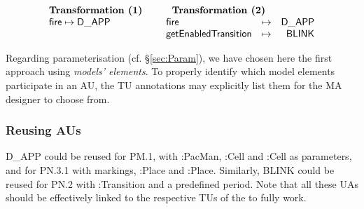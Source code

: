 $$\begin{array}[t]{l}
   \textbf{Transformation (1)}\\
   \mathsf{fire} \mapsto \mathsf{D\_APP}
\end{array}
\hspace{0.5cm}
\begin{array}[t]{lcr}
   \multicolumn{2}{c}{\textbf{Transformation (2)}}\\
	\mathsf{fire} &\mapsto& \mathsf{D\_APP}\\
	\mathsf{getEnabledTransition} &\mapsto& \mathsf{BLINK}	
\end{array}$$

Regarding parameterisation (cf. \S \ref{sec:Param}), we have chosen here
the first approach using \emph{models' elements}. To properly identify which
model elements participate in an AU, the TU annotations may explicitly list them
for the MA designer to choose from.

\subsubsection{Reusing AUs}
\label{sec:Proposal-Reuse}

\textsf{D\_APP} could be reused for \textsf{PM.1}, with \textsf{:PacMan},
\textsf{:Cell} and \textsf{:Cell} as parameters, and for \textsf{PN.3.1}
with \textsf{markings}, \textsf{:Place} and \textsf{:Place}. Similarly,
\textsf{BLINK} could be reused for \textsf{PN.2} with \textsf{:Transition}
and a predefined \textsf{period}. Note that all these UAs should be
effectively linked to the respective TUs of the \DSLs to fully work.
